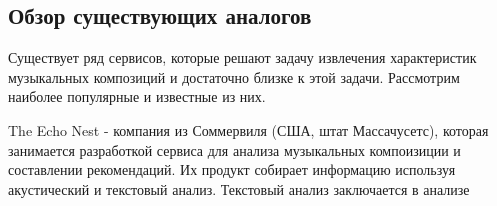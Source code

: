 \subsection{Обзор существующих аналогов}
\label{sec:analysis:analogues}

Существует ряд сервисов, которые решают задачу извлечения характеристик музыкальных композиций и достаточно близке к этой задачи. Рассмотрим наиболее популярные и известные из них.

The Echo Nest - компания из Соммервиля (США, штат Массачусетс), которая занимается разработкой сервиса для анализа музыкальных компоизиции и составлении рекомендаций. Их продукт собирает информацию используя акустический и текстовый анализ. Текстовый анализ заключается в анализе  
